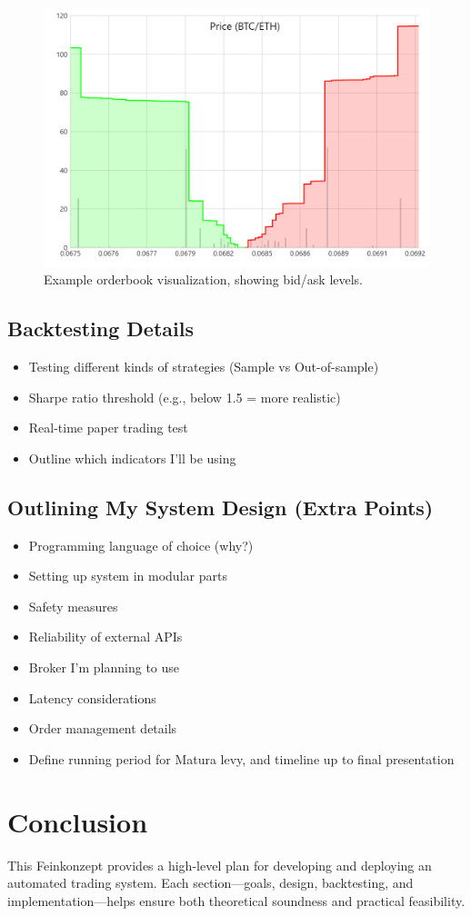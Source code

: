 \documentclass[9pt,a4paper,twocolumn,twoside]{tau-class/tau}
\begin{document}
\begin{figure}[H]
    \centering
    \includegraphics[width=0.85\columnwidth]{figures/orderbook.png}
    \caption{Example orderbook visualization, showing bid/ask levels.}
    \label{fig:orderbook}
\end{figure}

\subsection{Backtesting Details}
\begin{itemize}
  \item Testing different kinds of strategies (Sample vs Out-of-sample)
  \item Sharpe ratio threshold (e.g., below 1.5 = more realistic)
  \item Real-time paper trading test
  \item Outline which indicators I’ll be using
\end{itemize}

\subsection{Outlining My System Design (Extra Points)}
\begin{itemize}
  \item Programming language of choice (why?)
  \item Setting up system in modular parts
  \item Safety measures
  \item Reliability of external APIs
  \item Broker I'm planning to use
  \item Latency considerations
  \item Order management details
  \item Define running period for Matura levy, and timeline up to final presentation
\end{itemize}

\section{Conclusion}
This Feinkonzept provides a high-level plan for developing and deploying 
an automated trading system. Each section—goals, design, backtesting, 
and implementation—helps ensure both theoretical soundness and practical 
feasibility.

\end{document}
